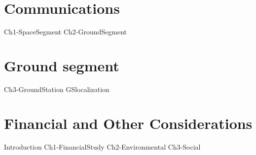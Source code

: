 % 
%





\setlength{\parindent}{0pt}

\usepackage{epigraph}
\usepackage{tocloft}




\newpage\thispagestyle{EmptyPage}
\mbox{}\newpage


\setcounter{tocdepth}{3}
\tableofcontents
\pagebreak

\renewcommand{\cfttabnumwidth}{4em}
\listoftables
\pagebreak

\renewcommand{\cftfignumwidth}{4em}
\listoffigures



\newpage
{}

\newpage
\setlength{\parskip}{1em}
\part{Communications}
{Ch1-SpaceSegment}
{Ch2-GroundSegment}
\part{Ground segment}
{Ch3-GroundStation}
{GSlocalization}
\part{Financial and Other Considerations}
{Introduction}
{Ch1-FinancialStudy}
{Ch2-Environmental}
{Ch3-Social}



